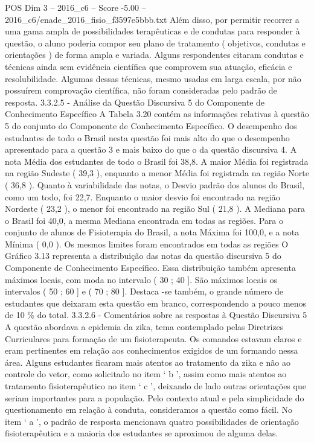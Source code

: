 \begin{textsample}{POS Dim 3 – 2016\_c6 – Score -5.00 – 2016\_c6/enade\_2016\_fisio\_f3597e5bbb.txt}
Além disso, por permitir recorrer a uma gama ampla de possibilidades terapêuticas e de condutas para responder à questão, o aluno poderia compor seu plano de tratamento ( objetivos, condutas e orientações ) de forma ampla e variada.
Alguns respondentes citaram condutas e técnicas ainda sem evidência científica que comprovem sua atuação, eficácia e resolubilidade.
Algumas dessas técnicas, mesmo usadas em larga escala, por não possuírem comprovação científica, não foram consideradas pelo padrão de resposta. 3.3.2.5 - Análise da Questão Discursiva 5 do Componente de Conhecimento Específico A Tabela 3.20 contém as informações relativas à questão 5 do conjunto do Componente de Conhecimento Específico.
O desempenho dos estudantes de todo o Brasil nesta questão foi mais alto do que o desempenho apresentado para a questão 3 e mais baixo do que o da questão discursiva 4.
A nota Média dos estudantes de todo o Brasil foi 38,8.
A maior Média foi registrada na região Sudeste ( 39,3 ), enquanto a menor Média foi registrada na região Norte ( 36,8 ).
Quanto à variabilidade das notas, o Desvio padrão dos alunos do Brasil, como um todo, foi 22,7.
Enquanto o maior desvio foi encontrado na região Nordeste ( 23,2 ), o menor foi encontrado na região Sul ( 21,8 ).
A Mediana para o Brasil foi 40,0, a mesma Mediana encontrada em todas as regiões.
Para o conjunto de alunos de Fisioterapia do Brasil, a nota Máxima foi 100,0, e a nota Mínima ( 0,0 ).
Os mesmos limites foram encontrados em todas as regiões O Gráfico 3.13 representa a distribuição das notas da questão discursiva 5 do Componente de Conhecimento Específico.
Essa distribuição também apresenta máximos locais, com moda no intervalo ( 30 ; 40 ].
São máximos locais os intervalos ( 50 ; 60 ] e ( 70 ; 80 ].
Destaca -se também, o grande número de estudantes que deixaram esta questão em branco, correspondendo a pouco menos de 10 \% do total. 3.3.2.6 - Comentários sobre as respostas à Questão Discursiva 5 A questão abordava a epidemia da zika, tema contemplado pelas Diretrizes Curriculares para formação de um fisioterapeuta.
Os comandos estavam claros e eram pertinentes em relação aos conhecimentos exigidos de um formando nessa área.
Alguns estudantes ficaram mais atentos ao tratamento da zika e não ao controle do vetor, como solicitado no item ‘ b ’, assim como mais atentos ao tratamento fisioterapêutico no item ‘ c ’, deixando de lado outras orientações que seriam importantes para a população.
Pelo contexto atual e pela simplicidade do questionamento em relação à conduta, consideramos a questão como fácil.
No item ‘ a ’, o padrão de resposta mencionava quatro possibilidades de orientação fisioterapêutica e a maioria dos estudantes se aproximou de alguma delas.

\end{textsample}
